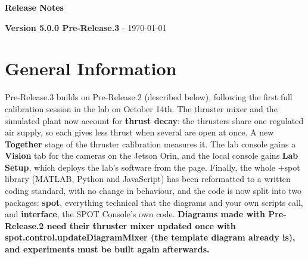 \documentclass[11pt]{article}
\begin{document}
\begin{center}
    \Huge \textcolor{primaryColor}{\textbf{Release Notes}}

    \vspace{0.5cm}
    \Large \textbf{Version 5.0.0 Pre-Release.3} - \today
\end{center}

\vspace{1cm}

\section*{\textcolor{primaryColor}{General Information}}
Pre-Release.3 builds on Pre-Release.2 (described below), following the first full calibration session in the lab on October 14th. The thruster mixer and the simulated plant now account for \textbf{thrust decay}: the thrusters share one regulated air supply, so each gives less thrust when several are open at once. A new \textbf{Together} stage of the thruster calibration measures it. The lab console gains a \textbf{Vision} tab for the cameras on the Jetson Orin, and the local console gains \textbf{Lab Setup}, which deploys the lab's software from the page. Finally, the whole +spot library (MATLAB, Python and JavaScript) has been reformatted to a written coding standard, with no change in behaviour, and the code is now split into two packages: \textbf{spot}, everything technical that the diagrams and your own scripts call, and \textbf{interface}, the SPOT Console's own code. \textbf{Diagrams made with Pre-Release.2 need their thruster mixer updated once with spot.control.updateDiagramMixer (the template diagram already is), and experiments must be built again afterwards.}
\end{document}
